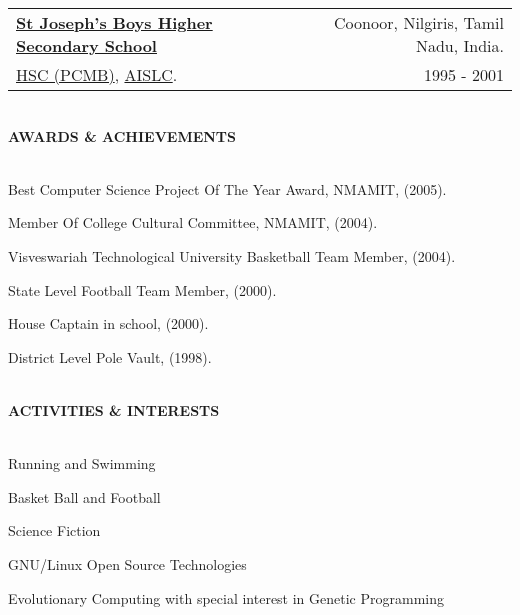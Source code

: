 \documentclass[10pt]{article}
\makeatletter
\newcommand{\lineunder}{\vspace*{-10pt} \\ \hspace*{-18pt} \hrulefill \vspace{2pt}\\}
\newcommand{\header}[1]{{\hspace*{-15pt}\vspace*{-0pt}\\ \uppercase{\textbf {#1}}}  \lineunder}
\newcommand{\employer}[4]{ 
        \vspace*{6pt}
	\begin{tabular*}{\textwidth}{l@{\extracolsep{\fill}}r}
	\textbf{#1} & #2 \\
                #3  & #4 \\ 
	\end{tabular*}
}
\newenvironment{achievements}{
        \vspace{-0pt}
        \begin{list}
        {}
        {\topsep 0pt \itemsep -3pt}
}
{
        \end{list}
}
\makeatother
\begin{document}
\employer{\href{http://www.stjosephscoonoor.com}{St Joseph's Boys Higher Secondary School}} { Coonoor, Nilgiris, Tamil Nadu, India.}
{\href{http://en.wikipedia.org/wiki/Higher_Secondary_(School)_Certificate}{HSC (PCMB)}, \href{http://www.google.com/search?q=anglo+indian+school+leaving+certificate}{AISLC}. }{ 1995 - 2001  }

\header{Awards \& Achievements} 
\begin{achievements}
\item Best Computer Science Project Of The Year Award, NMAMIT, (2005). \\
\item Member Of College Cultural Committee, NMAMIT, (2004). \\
\item Visveswariah Technological University Basketball Team Member, (2004).\\
\item State Level Football Team Member, (2000).\\
\item House Captain in school, (2000).\\
\item District Level Pole Vault, (1998).\\
\end{achievements}

\header{Activities \& Interests} 
\begin{achievements}
\item Running and Swimming \\
\item Basket Ball and Football \\
\item Science Fiction \\
\item GNU/Linux Open Source Technologies \\
\item Evolutionary Computing with special interest in Genetic Programming \\
\end{achievements}
\end{document}
